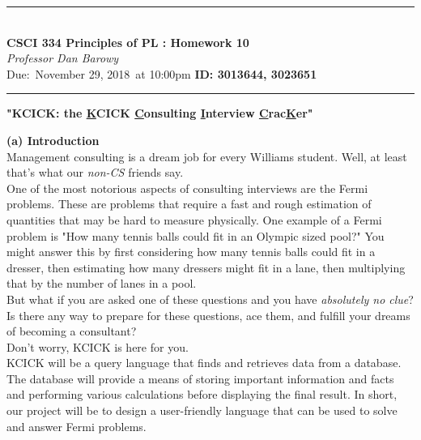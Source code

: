 \documentclass{article}
\newcounter{partCounter}
\newcommand{\hmwkTitle}{Homework 10}
\newcommand{\hmwkDueDate}{November 29, 2018}
\newcommand{\hmwkClass}{CSCI 334 Principles of PL }
\newcommand{\hmwkClassTime}{}
\newcommand{\hmwkClassInstructor}{Professor Dan Barowy}
\renewcommand{\maketitle}{\bgroup\vspace*{-0.75in}
\setlength{\parindent}{0pt}
\begin{flushleft}
\noindent\rule{6.5in}{0.6pt}\\[3mm]
{\Large\textbf{\hmwkClass: \hmwkTitle}}\\[2mm]
\textit{\hmwkClassInstructor\ \hmwkClassTime} \\ 
\normalsize {\small Due:\ \hmwkDueDate\ at 10:00pm} \hfill 
\textbf{ID: 3013644, 3023651 $\;$}\\
\noindent\rule{6.5in}{0.6pt}
\end{flushleft}\egroup
}
\begin{document}
\thispagestyle{plain}
\maketitle
\renewcommand{\part}[1]{\textbf{\large Part
\Alph{partCounter}}\stepcounter{partCounter}\\}

\vspace{20pt}
\begin{center}
{\selectfont
\Large{\textbf{"KCICK: the \underline{K}CICK  \underline{C}onsulting \underline{I}nterview \underline{C}rac\underline{K}er"}}
}
\end{center}
\selectfont
\vspace{20pt}
{\large \textbf{(a) Introduction }} \\

Management consulting is a dream job for every Williams student. Well, at least that's what our \textit{non-CS} friends say.\\ 

One of the most notorious aspects of consulting interviews are the Fermi problems. These are problems that require a fast and rough estimation of quantities that may be hard to measure physically. One example of a Fermi problem is "How many tennis balls could fit in an Olympic sized pool?" You might answer this by first considering how many tennis balls could fit in a dresser, then estimating how many dressers might fit in a lane, then multiplying that by the number of lanes in a pool. \\

But what if you are asked one of these questions and you have \emph{absolutely no clue}? Is there any way to prepare for these questions, ace them, and  fulfill your dreams of becoming a consultant?\\

Don't worry, KCICK is here for you.\\

KCICK will be a query language that finds and retrieves data from a database. The database will provide a means of storing important information and facts and performing various calculations before displaying the final result. In short, our project will be to design a user-friendly language that can be used to solve and answer Fermi problems. \\
\end{document}
